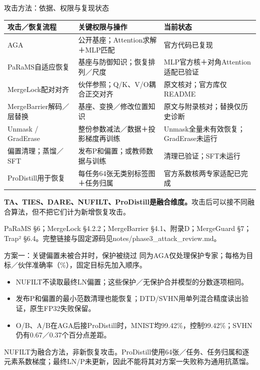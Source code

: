 \documentclass[aspectratio=169,11pt]{beamer}
\newcommand{\source}[1]{{\vfill\scriptsize\color{muted}#1\par}}
\begin{document}
\begin{frame}{攻击方法：依据、权限与复现状态}
\scriptsize
\setlength{\tabcolsep}{4pt}
\renewcommand{\arraystretch}{1.28}
\begin{tabular}{@{}p{3.4cm}p{6.2cm}p{3.9cm}@{}}
\toprule
攻击／恢复流程 & 关键权限与操作 & 当前状态\\
\midrule
AGA & 公开基座；Attention求解＋MLP匹配 & 官方代码已复现\\
PaRaMS自适应恢复 & 基座与防御知识；恢复排列／尺度 & MLP官方核＋对角Attention适配已验证\\
MergeLock配对对齐 & 伙伴参照；Q/K、V/O耦合正交对齐 & 原文核对；官方库仅README\\
MergeBarrier解码／层替换 & 基座、变换／修改位置知识 & 原文与附录核对；替换仅历史诊断\\
Unmask / GradErase & 整份参数减法／数据＋投影梯度再训练 & Unmask全量未有效恢复；GradErase未运行\\
偏置清理；蒸馏／SFT & 发布P和偏置；或教师数据与训练 & 清理已验证；SFT未运行\\
ProDistill用于恢复 & 每任务64张无类别标签图＋任务归属 & 官方系数核两专家适配已完成\\
\bottomrule
\end{tabular}
\vspace{3mm}
\small
\textbf{TA、TIES、DARE、NUFILT、ProDistill是融合维度。}攻击后可以接不同融合算法，但不把它们计为新增恢复攻击。
\source{PaRaMS \S6；MergeLock \S4.2.2；MergeBarrier \S4.1、附录D；MergeGuard \S7；Trap² \S6.4。完整链接与固定源码见notes/phase3\_attack\_review.md。}
\end{frame}

\begin{frame}{方案一：关键偏置未被合并时，保护被绕过}
\small
同为AGA仅处理保护专家；每格为目标／伙伴准确率（\%），固定目标先加入顺序。
\begin{center}\footnotesize
\PhaseOneRecoveryTable
\end{center}
\begin{itemize}\setlength{\itemsep}{6pt}
\item NUFILT不读取最终LN偏置；这些保护／无保护合并模型的分数逐项相同。
\item 发布P和偏置的最小范数清理也能恢复；DTD/SVHN用单列混合精度读出验证，原生FP32失败保留。
\item O/B、A/B在AGA后接ProDistill时，MNIST均99.42\%，控制99.42\%；SVHN仍有0.67／0.37个百分点差距。
\end{itemize}
\source{NUFILT为融合方法，非新恢复攻击。ProDistill使用64张／任务、任务归属和逐元素系数梯度；最终LN/P未更新，因此不能将其对方案一失败称为通用抗蒸馏。}
\end{frame}
\end{document}
